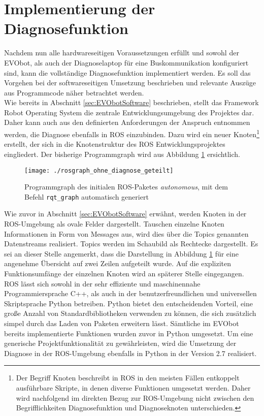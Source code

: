 \section{Implementierung der Diagnosefunktion} \label{sec:ImplementierungDiagnose} %

Nachdem nun alle hardwareseitigen Voraussetzungen erfüllt und sowohl der EVObot, als auch der Diagnoselaptop für eine Buskommunikation konfiguriert sind, kann die vollständige Diagnosefunktion implementiert werden. Es soll das Vorgehen bei der softwareseitigen Umsetzung beschrieben und relevante Auszüge aus Programmcode näher betrachtet werden.\\
Wie bereits in Abschnitt \ref{sec:EVObotSoftware} beschrieben, stellt das Framework Robot Operating System die zentrale Entwicklungsumgebung des Projektes dar. Daher kann auch aus den definierten Anforderungen der Anspruch entnommen werden, die Diagnose ebenfalls in ROS einzubinden. Dazu wird ein neuer Knoten\footnote{Der Begriff Knoten beschreibt in ROS in den meisten Fällen entkoppelt ausführbare Skripte, in denen diverse Funktionen umgesetzt werden. Daher wird nachfolgend im direkten Bezug zur ROS-Umgebung nicht zwischen den Begrifflichkeiten Diagnosefunktion und Diagnoseknoten unterschieden.} erstellt, der sich in die Knotenstruktur des ROS Entwicklungsprojektes eingliedert. Der bisherige Programmgraph wird aus Abbildung \ref{abb:rosgraphOhneDiagnose} ersichtlich.

\begin{figure}[!htbp]
	\centering
	\texttt{[image: ./rosgraph\_ohne\_diagnose\_geteilt]}
	\caption{Programmgraph des initialen ROS-Paketes \emph{autonomous}, mit dem Befehl \texttt{rqt\_graph} automatisch generiert}
	\label{abb:rosgraphOhneDiagnose}
\end{figure} 

Wie zuvor in Abschnitt \ref{sec:EVObotSoftware} erwähnt, werden Knoten in der ROS-Umgebung als ovale Felder dargestellt. Tauschen einzelne Knoten Informationen in Form von Messages aus, wird dies über die Topics genannten Datenstreams realisiert. Topics werden im Schaubild als Rechtecke dargestellt. Es sei an dieser Stelle angemerkt, dass die Darstellung in Abbildung \ref{abb:rosgraphOhneDiagnose} für eine angenehme Übersicht auf zwei Zeilen aufgeteilt wurde. Auf die expliziten Funktionsumfänge der einzelnen Knoten wird an späterer Stelle eingegangen.\\
ROS lässt sich sowohl in der sehr effiziente und maschinennahe Programmiersprache C++, als auch in der benutzerfreundlichen und universellen Skriptsprache Python betreiben. Python bietet den entscheidenden Vorteil, eine große Anzahl von Standardbibliotheken verwenden zu können, die sich zusätzlich simpel durch das Laden von Paketen erweitern lässt. Sämtliche im EVObot bereits implementierte Funktionen wurden zuvor in Python umgesetzt. Um eine generische Projektfunktionalität zu gewährleisten, wird die Umsetzung der Diagnose in der ROS-Umgebung ebenfalls in Python in der Version 2.7 realisiert.


